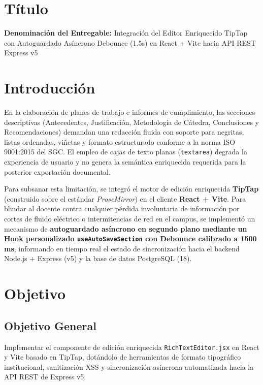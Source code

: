 \documentclass[12pt,a4paper]{article}
\begin{document}
\section{Título}
\textbf{Denominación del Entregable:} Integración del Editor Enriquecido TipTap con Autoguardado Asíncrono Debounce (1.5s) en React + Vite hacia API REST Express v5



\section{Introducción}
En la elaboración de planes de trabajo e informes de cumplimiento, las secciones descriptivas (Antecedentes, Justificación, Metodología de Cátedra, Conclusiones y Recomendaciones) demandan una redacción fluida con soporte para negritas, listas ordenadas, viñetas y formato estructurado conforme a la norma ISO 9001:2015 del SGC. El empleo de cajas de texto planas (\texttt{textarea}) degrada la experiencia de usuario y no genera la semántica enriquecida requerida para la posterior exportación documental.

Para subsanar esta limitación, se integró el motor de edición enriquecida \textbf{TipTap} (construido sobre el estándar \textit{ProseMirror}) en el cliente \textbf{React + Vite}. Para blindar al docente contra cualquier pérdida involuntaria de información por cortes de fluido eléctrico o intermitencias de red en el campus, se implementó un mecanismo de \textbf{autoguardado asíncrono en segundo plano mediante un Hook personalizado \texttt{useAutoSaveSection} con Debounce calibrado a 1500 ms}, informando en tiempo real el estado de sincronización hacia el backend Node.js + Express (v5) y la base de datos PostgreSQL (18).

\section{Objetivo}

\subsection{Objetivo General}
Implementar el componente de edición enriquecida \texttt{RichTextEditor.jsx} en React y Vite basado en TipTap, dotándolo de herramientas de formato tipográfico institucional, sanitización XSS y sincronización asíncrona automatizada hacia la API REST de Express v5.
\end{document}

